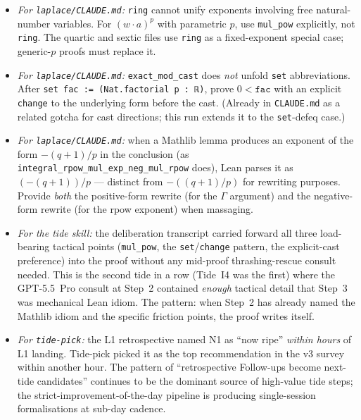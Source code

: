 \documentclass[11pt]{article}
\begin{document}
\begin{itemize}[leftmargin=1em,itemsep=0.2em]
\item \emph{For \texttt{laplace/CLAUDE.md}:} \texttt{ring} cannot
  unify exponents involving free natural-number variables. For
  $(w\cdot a)^p$ with parametric $p$, use \texttt{mul\_pow}
  explicitly, not \texttt{ring}. The quartic and sextic files use
  \texttt{ring} as a fixed-exponent special case; generic-$p$
  proofs must replace it.

\item \emph{For \texttt{laplace/CLAUDE.md}:} \texttt{exact\_mod\_cast}
  does \emph{not} unfold \texttt{set} abbreviations. After
  \texttt{set fac := (Nat.factorial p : ℝ)}, prove $0 < \texttt{fac}$
  with an explicit \texttt{change} to the underlying form before
  the cast. (Already in \texttt{CLAUDE.md} as a related gotcha for
  cast directions; this run extends it to the \texttt{set}-defeq
  case.)

\item \emph{For \texttt{laplace/CLAUDE.md}:} when a Mathlib lemma
  produces an exponent of the form $-(q+1)/p$ in the conclusion (as
  \texttt{integral\_rpow\_mul\_exp\_neg\_mul\_rpow} does), Lean
  parses it as $(-(q+1))/p$ — distinct from $-((q+1)/p)$ for
  rewriting purposes. Provide \emph{both} the positive-form rewrite
  (for the $\Gamma$ argument) and the negative-form rewrite (for the
  rpow exponent) when massaging.

\item \emph{For the tide skill:} the deliberation transcript carried
  forward all three load-bearing tactical points (\texttt{mul\_pow},
  the \texttt{set}/\texttt{change} pattern, the explicit-cast
  preference) into the proof without any mid-proof
  thrashing-rescue consult needed. This is the second tide in a row
  (Tide~I4 was the first) where the GPT-5.5~Pro consult at Step~2
  contained \emph{enough} tactical detail that Step~3 was mechanical
  Lean idiom. The pattern: when Step~2 has already named the
  Mathlib idiom and the specific friction points, the proof writes
  itself.

\item \emph{For \texttt{tide-pick}:} the L1 retrospective named N1
  as ``now ripe'' \emph{within hours} of L1 landing. Tide-pick
  picked it as the top recommendation in the v3 survey within
  another hour. The pattern of ``retrospective Follow-ups become
  next-tide candidates'' continues to be the dominant source of
  high-value tide steps; the strict-improvement-of-the-day pipeline
  is producing single-session formalisations at sub-day cadence.
\end{itemize}
\end{document}
